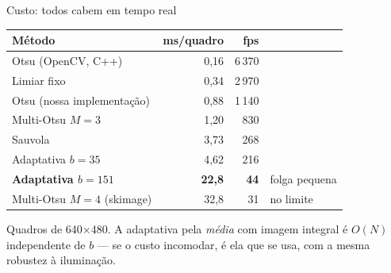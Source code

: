 \documentclass[aspectratio=169,12pt]{beamer}
\newcommand{\sub}[1]{{\small\textcolor{cinza}{#1}}}
\begin{document}
\begin{frame}{Custo: todos cabem em tempo real}

  \footnotesize
  \begin{center}
  \begin{tabular}{@{}lrrl@{}}
    \toprule
    \textbf{Método} & \textbf{ms/quadro} & \textbf{fps} & \\
    \midrule
    Otsu (OpenCV, C++)        & 0,16  & 6\,370 & \\
    Limiar fixo               & 0,34  & 2\,970 & \\
    Otsu (nossa implementação)& 0,88  & 1\,140 & \\
    Multi-Otsu $M=3$          & 1,20  & 830    & \\
    Sauvola                   & 3,73  & 268    & \\
    Adaptativa $b{=}35$       & 4,62  & 216    & \\
    \textbf{Adaptativa $b{=}151$} & \textbf{22,8} & \textbf{44} & folga pequena \\
    Multi-Otsu $M=4$ (skimage)& 32,8  & 31     & \textcolor{cMulti}{no limite} \\
    \bottomrule
  \end{tabular}
  \end{center}

  \vspace{.8em}
  \normalsize
  \sub{Quadros de 640$\times$480. A adaptativa pela \emph{média} com imagem
  integral é $O(N)$ independente de $b$ — se o custo incomodar, é ela que se
  usa, com a mesma robustez à iluminação.}

\end{frame}
\end{document}
